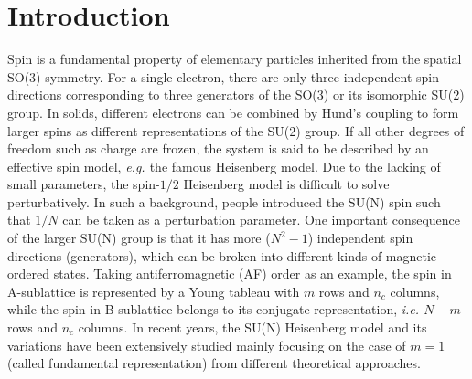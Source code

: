 \documentclass[aps,twocolumn,superscriptaddress]{revtex4-1}
\newcommand{\ie}{\textit{i.e.{ }}}
\newcommand{\eg}{\textit{e.g.{ }}}
\begin{document}
\section{Introduction}
Spin is a fundamental property of elementary particles inherited from the spatial SO(3) symmetry. For a single electron,
there are only three independent spin directions corresponding to three generators of the SO(3) or its isomorphic SU(2) group. In solids, different
electrons can be combined by Hund's coupling to form larger spins as different representations of the SU(2)
group. If all other degrees of freedom such as charge are frozen, the system is said to be described by an effective
spin model, \eg the famous Heisenberg model. Due to the lacking of small parameters, the spin-$1/2$ Heisenberg model is
difficult to solve perturbatively. In such a background, people introduced the SU(N) spin such that $1/N$ can
be taken as a perturbation parameter.
\cite{affleck1985,affleck1988,*marston1989,arovas1988,read1989,*read1989a,*read1990} One important consequence of the
larger SU(N) group is that it has more ($N^2-1$) independent spin directions (generators), which can be broken into
different kinds of magnetic ordered states. Taking antiferromagnetic (AF) order as an example, the spin in A-sublattice
is represented by a Young tableau with $m$ rows and $n_c$ columns, while the spin in B-sublattice belongs to its
conjugate representation, \ie $N-m$ rows and $n_c$ columns. In recent years, the SU(N) Heisenberg model and its
variations have been extensively studied mainly focusing on the case of $m=1$ (called fundamental representation) from
different theoretical approaches.
\cite{harada2003,buchta2007,kawashima2007,arovas2008,beach2009,lou2009,rachel2009,kaul2012,harada2013,nataf2014,okubo2015,suzuki2015,nataf2016}
\end{document}
